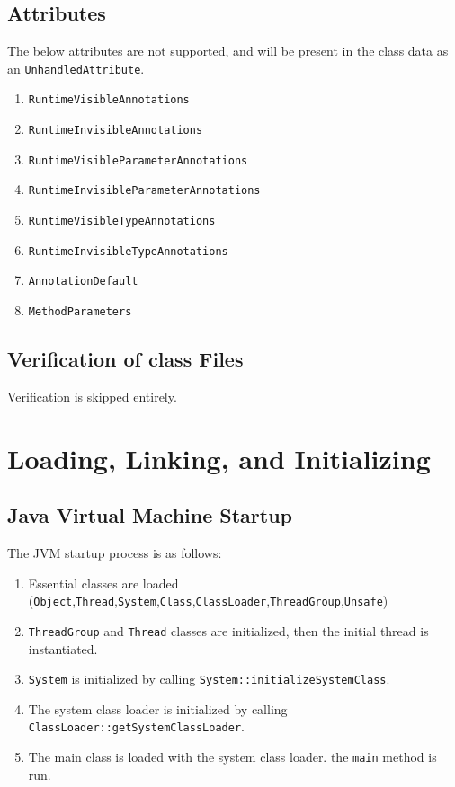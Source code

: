 \subsection{Attributes}

The below attributes are not supported, and will be present in the class data as an \texttt{UnhandledAttribute}.

\begin{enumerate}
	\item \texttt{RuntimeVisibleAnnotations}
	\item \texttt{RuntimeInvisibleAnnotations}
	\item \texttt{RuntimeVisibleParameterAnnotations}
	\item \texttt{RuntimeInvisibleParameterAnnotations}
	\item \texttt{RuntimeVisibleTypeAnnotations}
	\item \texttt{RuntimeInvisibleTypeAnnotations}
	\item \texttt{AnnotationDefault}
	\item \texttt{MethodParameters}
\end{enumerate}

\subsection{Verification of class Files}

Verification is skipped entirely.

\section{Loading, Linking, and Initializing}

\subsection{Java Virtual Machine Startup}

The JVM startup process is as follows:

\begin{enumerate}
	\item Essential classes are loaded (\texttt{Object},\texttt{Thread},\texttt{System},\texttt{Class},\texttt{ClassLoader},\texttt{ThreadGroup},\texttt{Unsafe})
	\item \texttt{ThreadGroup} and \texttt{Thread} classes are initialized, then the initial thread is instantiated.
	\item \texttt{System} is initialized by calling \texttt{System::initializeSystemClass}.
	\item The system class loader is initialized by calling \texttt{ClassLoader::getSystemClassLoader}.
	\item The main class is loaded with the system class loader. the \texttt{main} method is run.
\end{enumerate}

